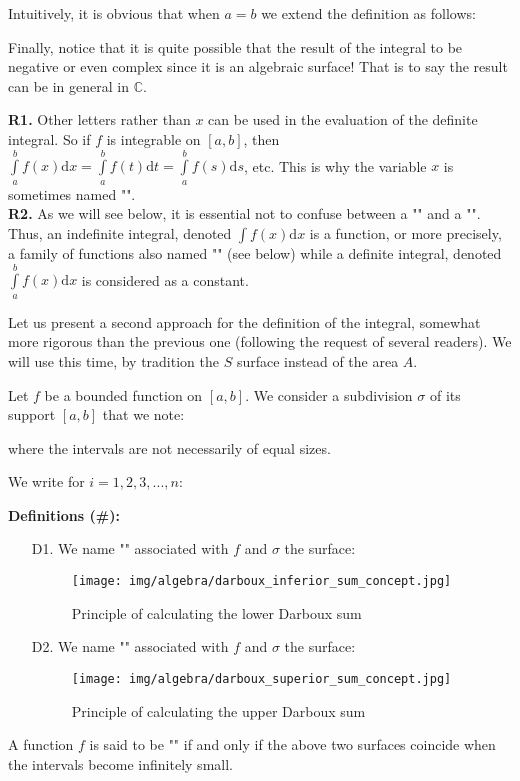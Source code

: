 		Intuitively, it is obvious that when $a=b$ we extend the definition as follows:
		
		Finally, notice that it is quite possible that the result of the integral to be negative or even complex since it is an algebraic surface! That is to say the result can be in general in $\mathbb{C}$.
	\begin{tcolorbox}[title=Remarks,colframe=black,arc=10pt]
	\textbf{R1.} Other letters rather than $x$ can be used in the evaluation of the definite integral. So if $f$ is integrable on $[a, b]$, then $\int\limits_a^bf(x)\mathrm{d}x=\int\limits_a^bf(t)\mathrm{d}t=\int\limits_a^bf(s)\mathrm{d}s$, etc. This is why the variable $x$ is sometimes named "".\\

	\textbf{R2.} As we will see below, it is essential not to confuse between a "" and a "". Thus, an indefinite integral, denoted $\int\limits f(x)\mathrm{d}x$ is a function, or more precisely, a family of functions also named "" (see below) while a definite integral, denoted $\int\limits_a^b f(x)\mathrm{d}x$ is considered as a constant.
	\end{tcolorbox}
	Let us present a second approach for the definition of the integral, somewhat more rigorous than the previous one  (following the request of several readers). We will use this time, by tradition the $S$ surface instead of the area $A$.
	
	Let $f$ be a bounded function on $[a, b]$. We consider a subdivision $\sigma$ of its support $[a, b]$ that we note:
	
	where the intervals are not necessarily of equal sizes.

	We write for $i=1,2,3,...,n$:	
	
	
	\textbf{Definitions (\#\mydef):}
	\begin{enumerate}
		\item[D1.] We name "" associated with $f$ and $\sigma$ the surface:
		
		\begin{figure}[H]
			\centering
			\texttt{[image: img/algebra/darboux\_inferior\_sum\_concept.jpg]}
			\caption{Principle of calculating the lower Darboux sum}
		\end{figure}
		
		\item[D2.] We name "" associated with $f$ and $\sigma$ the surface:
		
		\begin{figure}[H]
			\centering
			\texttt{[image: img/algebra/darboux\_superior\_sum\_concept.jpg]}
			\caption{Principle of calculating the upper Darboux sum}
		\end{figure}
	\end{enumerate}
	A function $f$ is said to be "" if and only if the above two surfaces coincide when the intervals become infinitely small.
	
